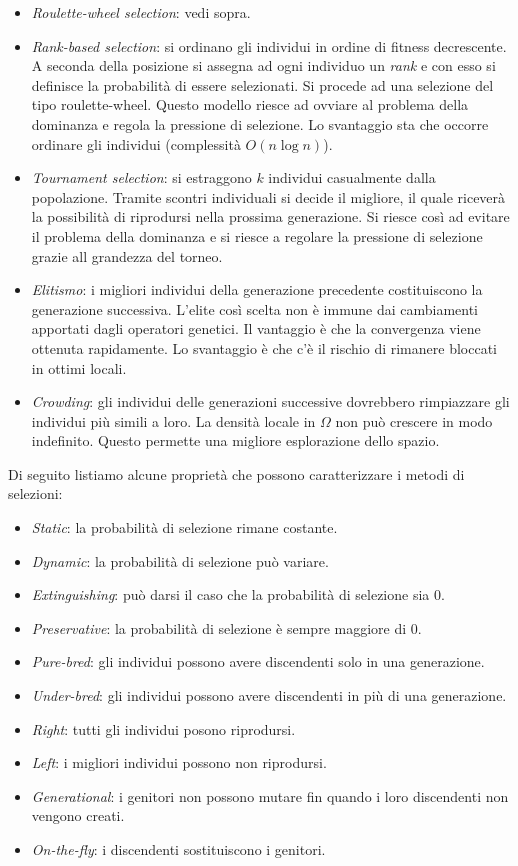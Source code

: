 \documentclass[10pt,a4paper]{article}
\begin{document}
\begin{itemize}
\item{\emph{Roulette-wheel selection}: vedi sopra.}
\item{\emph{Rank-based selection}: si ordinano gli individui in ordine di fitness decrescente. A seconda della posizione si assegna ad ogni individuo un \emph{rank} e con esso si definisce la probabilità di essere selezionati. Si procede ad una selezione del tipo roulette-wheel. Questo modello riesce ad ovviare al problema della dominanza e regola la pressione di selezione. Lo svantaggio sta che occorre ordinare gli individui (complessità $O(n \log n)$).}
\item{\emph{Tournament selection}: si estraggono $k$ individui casualmente dalla popolazione. Tramite scontri individuali si decide il migliore, il quale riceverà la possibilità di riprodursi nella prossima generazione. Si riesce così ad evitare il problema della dominanza e si riesce a regolare la pressione di selezione grazie all grandezza del torneo.}
\item{\emph{Elitismo}: i migliori individui della generazione precedente costituiscono la generazione successiva. L'elite così scelta non è immune dai cambiamenti apportati dagli operatori genetici. Il vantaggio è che la convergenza viene ottenuta rapidamente. Lo svantaggio è che c'è il rischio di rimanere bloccati in ottimi locali.}
\item{\emph{Crowding}: gli individui delle generazioni successive dovrebbero rimpiazzare gli individui più simili a loro. La densità locale in $\Omega$ non può crescere in modo indefinito. Questo permette una migliore esplorazione dello spazio.}
\end{itemize}

Di seguito listiamo alcune proprietà che possono caratterizzare i metodi di selezioni:

\begin{itemize}
\item{\emph{Static}: la probabilità di selezione rimane costante.}
\item{\emph{Dynamic}: la probabilità di selezione può variare.}
\item{\emph{Extinguishing}: può darsi il caso che la probabilità di selezione sia 0.}
\item{\emph{Preservative}: la probabilità di selezione è sempre maggiore di 0.}
\item{\emph{Pure-bred}: gli individui possono avere discendenti solo in una generazione.}
\item{\emph{Under-bred}: gli individui possono avere discendenti in più di una generazione.}
\item{\emph{Right}: tutti gli individui posono riprodursi.}
\item{\emph{Left}: i migliori individui possono non riprodursi.}
\item{\emph{Generational}: i genitori non possono mutare fin quando i loro discendenti non vengono creati.}
\item{\emph{On-the-fly}: i discendenti sostituiscono i genitori.}
\end{itemize}
\end{document}
